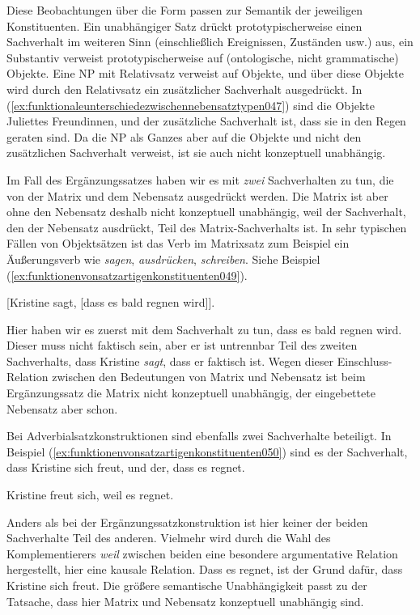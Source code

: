 Diese Beobachtungen über die Form passen zur Semantik der jeweiligen Konstituenten.
Ein unabhängiger Satz drückt prototypischerweise einen Sachverhalt im weiteren Sinn (einschließlich Ereignissen, Zuständen usw.) aus, ein Substantiv verweist prototypischerweise auf (ontologische, nicht grammatische) Objekte.
Eine NP mit Relativsatz verweist auf Objekte, und über diese Objekte wird durch den Relativsatz ein zusätzlicher Sachverhalt ausgedrückt.
In (\ref{ex:funktionaleunterschiedezwischennebensatztypen047}) sind die Objekte Juliettes Freundinnen, und der zusätzliche Sachverhalt ist, dass sie in den Regen geraten sind.
Da die NP als Ganzes aber auf die Objekte und nicht den zusätzlichen Sachverhalt verweist, ist sie auch nicht konzeptuell unabhängig.

Im Fall des Ergänzungssatzes haben wir es mit \textit{zwei} Sachverhalten zu tun, die von der Matrix und dem Nebensatz ausgedrückt werden.
Die Matrix ist aber ohne den Nebensatz deshalb nicht konzeptuell unabhängig, weil der Sachverhalt, den der Nebensatz ausdrückt, Teil des Matrix-Sachverhalts ist.
In sehr typischen Fällen von Objektsätzen ist das Verb im Matrixsatz zum Beispiel ein Äußerungsverb wie \textit{sagen}, \textit{ausdrücken}, \textit{schreiben}.
Siehe Beispiel (\ref{ex:funktionenvonsatzartigenkonstituenten049}).

\begin{exe}
  \ex\label{ex:funktionenvonsatzartigenkonstituenten049} [Kristine sagt, [dass es bald regnen wird]].
\end{exe}

Hier haben wir es zuerst mit dem Sachverhalt zu tun, dass es bald regnen wird.
Dieser muss nicht faktisch sein, aber er ist untrennbar Teil des zweiten Sachverhalts, dass Kristine \textit{sagt}, dass er faktisch ist. 
Wegen dieser Einschluss-Relation zwischen den Bedeutungen von Matrix und Nebensatz ist beim Ergänzungssatz die Matrix nicht konzeptuell unabhängig, der eingebettete Nebensatz aber schon.

Bei Adverbialsatzkonstruktionen sind ebenfalls zwei Sachverhalte beteiligt.
In Beispiel (\ref{ex:funktionenvonsatzartigenkonstituenten050}) sind es der Sachverhalt, dass Kristine sich freut, und der, dass es regnet.

\begin{exe}
  \ex\label{ex:funktionenvonsatzartigenkonstituenten050} Kristine freut sich, weil es regnet.
\end{exe}

Anders als bei der Ergänzungssatzkonstruktion ist hier keiner der beiden Sachverhalte Teil des anderen.
Vielmehr wird durch die Wahl des Komplementierers \textit{weil} zwischen beiden eine besondere argumentative Relation hergestellt, hier eine kausale Relation.
Dass es regnet, ist der Grund dafür, dass Kristine sich freut.
Die größere semantische Unabhängigkeit passt zu der Tatsache, dass hier Matrix und Nebensatz konzeptuell unabhängig sind.

